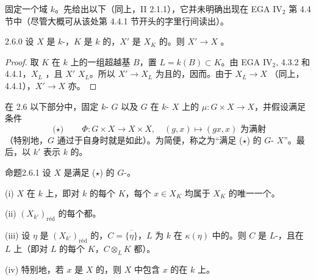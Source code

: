 固定一个域 $k$。先给出以下（同上，II 2.1.1），它并未明确出现在 EGA IV$_2$ 第 4.4 节中（尽管大概可从该处第 4.4.1 节开头的字里行间读出）。
\begin{SGAresult}{}{2.6.0}
设 $X$ 是 $k$-，$K$ 是 $k$ 的，$X'$ 是 $X_K$ 的。则 $X'\to X$ 。
\end{SGAresult}
\begin{proof}
取 $K$ 在 $k$ 上的一组超越基 $B$，置 $L=k(B)\subset K$。由 EGA IV$_2$, 4.3.2 和 4.4.1，$X_L$ ，且 $X'$  $X_L$。所以 $X'\to X_L$ 为且的，因而。由于 $X_L\to X$ （同上，4.4.1），$X'\to X$ 亦。
\end{proof}
在 2.6 以下部分中，固定 $k$- $G$ 以及 $G$ 在 $k$- $X$ 上的 $\mu:G\times X\to X$，并假设满足条件
\[
\text{($\star$)}\qquad\Phi:G\times X\longrightarrow X\times X,\quad(g,x)\longmapsto(gx,x)\text{ 为满射}
\]
（特别地，$G$ 通过于自身时就是如此）。为简便，称之为“满足 ($\star$) 的 $G$- $X$”。最后，以 $k'$ 表示 $k$ 的。
\begin{SGAresult}{命题}{2.6.1}
设 $X$ 是满足 ($\star$) 的 $G$-。

(i) $X$ 在 $k$ 上，即对 $k$ 的每个 $K$，每个 $x\in X_K$ 均属于 $X_K$ 的唯一一个。

(ii) $(X_{k'})_{\mathrm{r\text{é}d}}$ 的每个都。

(iii) 设 $\eta$ 是 $(X_{k'})_{\mathrm{r\text{é}d}}$ 的，$C=\overline{\{\eta\}}$，$L$ 为 $k$ 在 $\kappa(\eta)$ 中的。则 $C$ 是 $L$-，且在 $L$ 上（即对 $L$ 的每个 $K$，$C\otimes_L K$ 都）。

(iv) 特别地，若 $x$ 是 $X$ 的，则 $X$ 中包含 $x$ 的在 $k$ 上。
\end{SGAresult}
